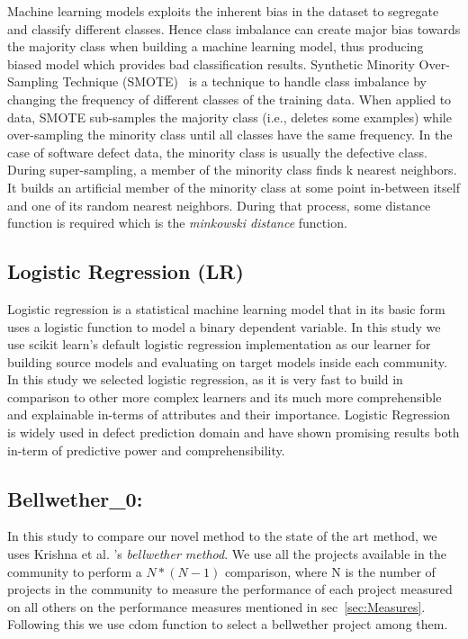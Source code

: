 \documentclass[sigconf,review]{acmart}
\theoremstyle{break}
\begin{document}
Machine learning models exploits the inherent bias in the dataset to segregate and classify different classes. Hence class imbalance can create major bias towards the majority class when building a machine learning model, thus producing biased model which provides bad classification results. Synthetic Minority Over-Sampling Technique (SMOTE)~\cite{chawla2002smote} is a technique to handle class imbalance by changing the frequency of different classes of the training data. When applied to data, SMOTE sub-samples the majority class (i.e., deletes some examples) while over-sampling the minority class until all classes have the same frequency. In the case of software defect data, the minority class is usually the defective class. During super-sampling, a member of the minority class finds k nearest neighbors. It builds an artificial member of the minority class at some point in-between itself and one of its random nearest neighbors. During that process, some distance function is required which is the \textit{minkowski distance} function.

\subsection{Logistic Regression (LR)}
\label{subsec:LR}

Logistic regression is a statistical machine learning model that in its basic form uses a logistic function to model a binary dependent variable. In this study we use scikit learn's default logistic regression implementation as our learner for building source models and evaluating on target models inside each community. In this study we selected logistic regression, as it is very fast to build in comparison to other more complex learners and its much more comprehensible and explainable in-terms of attributes and their importance. Logistic Regression is widely used in defect prediction domain and have shown promising results both in-term of predictive power and comprehensibility.


\subsection{Bellwether\_0:}
\label{Bellwether}

In this study to compare our novel method to the state of the art method, we uses Krishna et al. 's \textit{bellwether method}. We use all the projects available in the community to perform a $N*(N-1)$ comparison, where N is the number of projects in the community to measure the performance of each project measured on all others on the performance measures mentioned in sec~\ref{sec:Measures}. Following this we use cdom function to select a bellwether project among them. 
\end{document}
